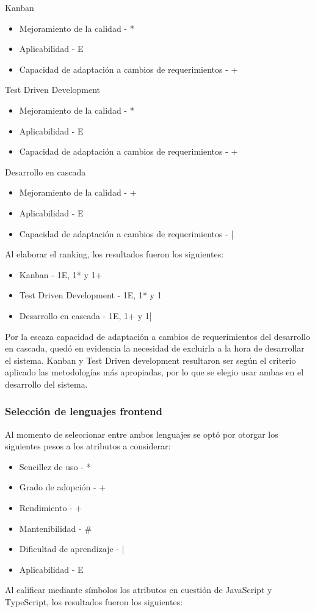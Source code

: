\documentclass{article}
\begin{document}
Kanban
\begin{itemize}
    \item Mejoramiento de la calidad - *
    \item Aplicabilidad - E
    \item Capacidad de adaptación a cambios de requerimientos - +
\end{itemize}
Test Driven Development
\begin{itemize}
    \item Mejoramiento de la calidad - *
    \item Aplicabilidad - E
    \item Capacidad de adaptación a cambios de requerimientos - +
\end{itemize}
Desarrollo en cascada
\begin{itemize}
    \item Mejoramiento de la calidad - +
    \item Aplicabilidad - E
    \item Capacidad de adaptación a cambios de requerimientos - |
\end{itemize}
Al elaborar el ranking, los resultados fueron los siguientes:
\begin{itemize}
    \item Kanban - 1E, 1* y 1+
    \item Test Driven Development - 1E, 1* y 1
    \item Desarrollo en cascada - 1E, 1+ y 1|
\end{itemize}
Por la escaza capacidad de adaptación a cambios de requerimientos del desarrollo en cascada, quedó en evidencia la necesidad de excluirla a la hora de desarrollar el sistema. Kanban y Test Driven development resultaron ser según el criterio aplicado las metodologías más apropiadas, por lo que se elegio usar ambas en el desarrollo del sistema.
\subsubsection{Selección de lenguajes frontend}
Al momento de seleccionar entre ambos lenguajes se optó por otorgar los siguientes pesos a los atributos a considerar:
\begin{itemize}
    \item Sencillez de uso - *
    \item Grado de adopción - +
    \item Rendimiento - +
    \item Mantenibilidad - \#
    \item Dificultad de aprendizaje - |
    \item Aplicabilidad - E
\end{itemize}
Al calificar mediante símbolos los atributos en cuestión de JavaScript y TypeScript, los resultados fueron los siguientes:
\end{document}
